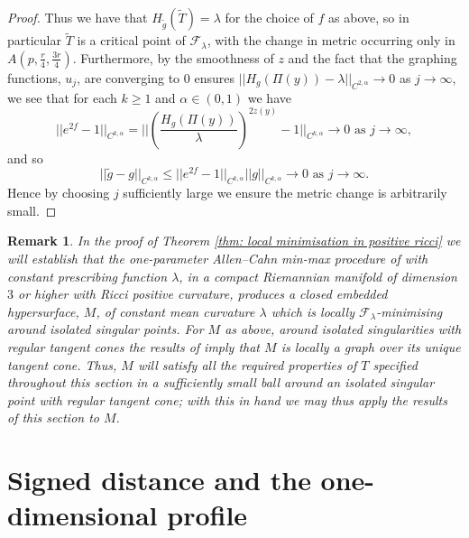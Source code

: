 \documentclass[11pt]{article}
\newtheorem{rem}{Remark}
\begin{document}
\begin{proof}
Thus we have that $H_{\tilde{g}}(\widetilde{T}) = \lambda$ for the choice of $f$ as above, so in particular $\widetilde{T}$ is a critical point of $\mathcal{F}_\lambda$, with the change in metric occurring only in $A(p, \frac{r}{4}, \frac{3r}{4})$. Furthermore, by the smoothness of $z$  and the fact that the graphing functions, $u_j$, are converging to $0$ ensures $||H_g(\Pi(y)) - \lambda||_{C^{2,\alpha}} \rightarrow 0$ as $j \rightarrow \infty$, we see that for each $k \geq 1$ and $\alpha \in (0,1)$ we have
\begin{equation*}
   ||e^{2f} - 1 ||_{C^{k,\alpha}} = \bigg|\bigg|\left(\frac{H_g(\Pi(y))}{\lambda}\right)^{2z(y)} - 1\bigg|\bigg|_{C^{k,\alpha}} \rightarrow 0 \text{ as } j \rightarrow \infty,
\end{equation*}
and so
\begin{equation*}
|| \tilde{g} - g ||_{C^{k,\alpha}} \leq ||e^{2f} - 1 ||_{C^{k,\alpha}} || g ||_{C^{k,\alpha}} \rightarrow 0 \text{ as } j \rightarrow \infty.
\end{equation*}
Hence by choosing $j$ sufficiently large we ensure the metric change is arbitrarily small.
\end{proof}

\begin{rem}\label{rem: surgery works on min-max cmc}
In the proof of Theorem \ref{thm: local minimisation in positive ricci} we will establish that the one-parameter Allen--Cahn min-max procedure of \cite{bellettini-wickramasekera} with constant prescribing function $\lambda$, in a compact Riemannian manifold of dimension $3$ or higher with Ricci positive curvature, produces a closed embedded hypersurface, $M$, of constant mean curvature $\lambda$ which is locally $\mathcal{F}_\lambda$-minimising around isolated singular points. For $M$ as above, around isolated singularities with regular tangent cones the results of \cite{simon} imply that $M$ is locally a graph over its unique tangent cone. Thus, $M$ will satisfy all the required properties of $T$ specified throughout this section in a sufficiently small ball around an isolated singular point with regular tangent cone; with this in hand we may thus apply the results of this section to $M$.
\end{rem}


\section{Signed distance and the one-dimensional profile}\label{sec: signed distance and one-dimensional profile}
\end{document}
